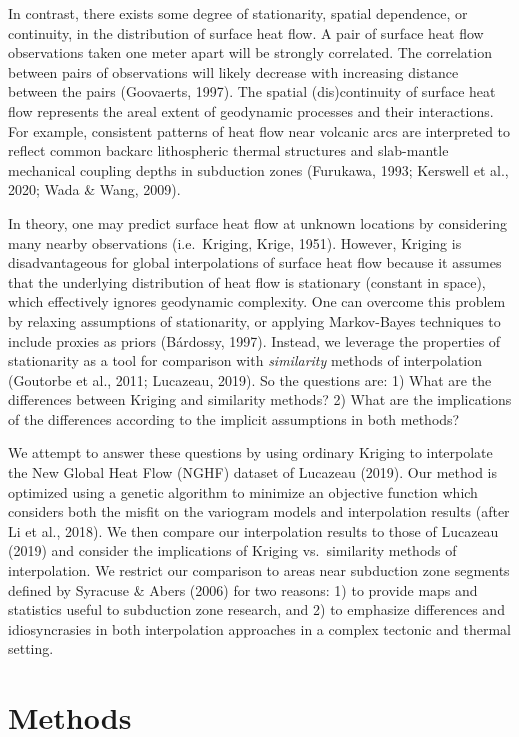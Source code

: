 \documentclass[draft,linenumbers]{agujournal2018}
\begin{document}
In contrast, there exists some degree of stationarity, spatial
dependence, or continuity, in the distribution of surface heat flow. A
pair of surface heat flow observations taken one meter apart will be
strongly correlated. The correlation between pairs of observations will
likely decrease with increasing distance between the pairs (Goovaerts,
1997). The spatial (dis)continuity of surface heat flow represents the
areal extent of geodynamic processes and their interactions. For
example, consistent patterns of heat flow near volcanic arcs are
interpreted to reflect common backarc lithospheric thermal structures
and slab-mantle mechanical coupling depths in subduction zones
(Furukawa, 1993; Kerswell et al., 2020; Wada \& Wang, 2009).

In theory, one may predict surface heat flow at unknown locations by
considering many nearby observations (i.e.~Kriging, Krige, 1951).
However, Kriging is disadvantageous for global interpolations of surface
heat flow because it assumes that the underlying distribution of heat
flow is stationary (constant in space), which effectively ignores
geodynamic complexity. One can overcome this problem by relaxing
assumptions of stationarity, or applying Markov-Bayes techniques to
include proxies as priors (Bárdossy, 1997). Instead, we leverage the
properties of stationarity as a tool for comparison with
\emph{similarity} methods of interpolation (Goutorbe et al., 2011;
Lucazeau, 2019). So the questions are: 1) What are the differences
between Kriging and similarity methods? 2) What are the implications of
the differences according to the implicit assumptions in both methods?

We attempt to answer these questions by using ordinary Kriging to
interpolate the New Global Heat Flow (NGHF) dataset of Lucazeau (2019).
Our method is optimized using a genetic algorithm to minimize an
objective function which considers both the misfit on the variogram
models and interpolation results (after Li et al., 2018). We then
compare our interpolation results to those of Lucazeau (2019) and
consider the implications of Kriging vs.~similarity methods of
interpolation. We restrict our comparison to areas near subduction zone
segments defined by Syracuse \& Abers (2006) for two reasons: 1) to
provide maps and statistics useful to subduction zone research, and 2)
to emphasize differences and idiosyncrasies in both interpolation
approaches in a complex tectonic and thermal setting.

\section{Methods}
\end{document}
